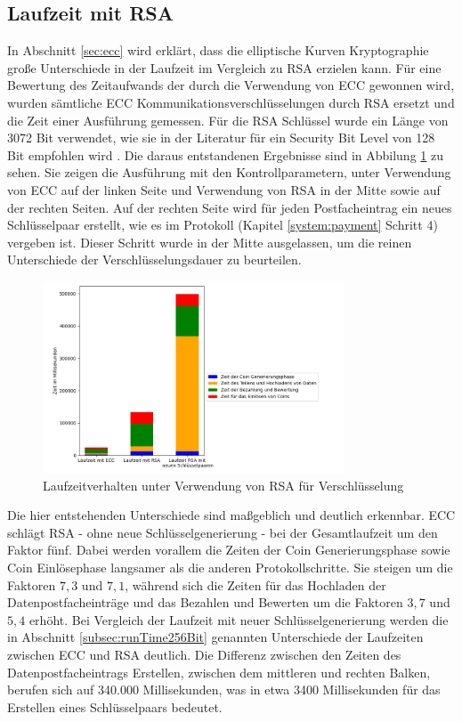 \documentclass{scrreprt}
\begin{document}
\subsection{Laufzeit mit RSA}
\label{subsec:runTimeRSA}
In Abschnitt \ref{sec:ecc} wird erklärt, dass die elliptische Kurven Kryptographie große Unterschiede in der Laufzeit im Vergleich zu RSA erzielen kann. Für eine Bewertung des Zeitaufwands der durch die Verwendung von ECC gewonnen wird, wurden sämtliche ECC Kommunikationsverschlüsselungen durch RSA ersetzt und die Zeit einer Ausführung gemessen. Für die RSA Schlüssel wurde ein Länge von 3072 Bit verwendet, wie sie in der Literatur für ein Security Bit Level von 128 Bit empfohlen wird \cite{elaine2016recommendation}. Die daraus entstandenen Ergebnisse sind in Abbilung \ref{fig:win_rsa} zu sehen. Sie zeigen die Ausführung mit den Kontrollparametern, unter Verwendung von ECC auf der linken Seite und Verwendung von RSA in der Mitte sowie auf der rechten Seiten. Auf der rechten Seite wird für jeden Postfacheintrag ein neues Schlüsselpaar erstellt, wie es im Protokoll (Kapitel \ref{system:payment} Schritt 4) vergeben ist. Dieser Schritt wurde in der Mitte ausgelassen, um die reinen Unterschiede der Verschlüsselungsdauer zu beurteilen.

\begin{figure}[h]
    \caption{Laufzeitverhalten unter Verwendung von RSA für Verschlüsselung}
    \label{fig:win_rsa}
    \centering
    \includegraphics[width=0.8\textwidth]{figure_win_RSA.png}
\end{figure}
Die hier entstehenden Unterschiede sind maßgeblich und deutlich erkennbar. ECC schlägt RSA - ohne neue Schlüsselgenerierung - bei der Gesamtlaufzeit um den Faktor fünf. Dabei werden vorallem die Zeiten der Coin Generierungsphase sowie Coin Einlösephase langsamer als die anderen Protokollschritte. Sie steigen um die Faktoren $7,3$ und $7,1$, während sich die Zeiten für das Hochladen der Datenpostfacheinträge und das Bezahlen und Bewerten um die Faktoren $3,7$ und $5,4$ erhöht. Bei Vergleich der Laufzeit mit neuer Schlüsselgenerierung werden die in Abschnitt \ref{subsec:runTime256Bit} genannten Unterschiede der Laufzeiten zwischen ECC und RSA deutlich. Die Differenz zwischen den Zeiten des Datenpostfacheintrags Erstellen, zwischen dem mittleren und rechten Balken, berufen sich auf 340.000 Millisekunden, was in etwa 3400 Millisekunden für das Erstellen eines Schlüsselpaars bedeutet.
\end{document}
